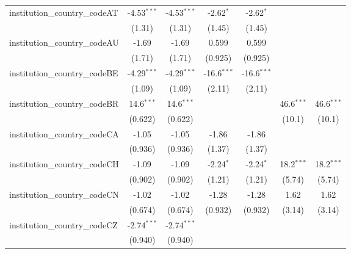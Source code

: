 \begin{tabular}{lcccccc}
   institution\_country\_codeAT          & -4.53$^{***}$ & -4.53$^{***}$ & -2.62$^{*}$   & -2.62$^{*}$   &               &   \\   
                                         & (1.31)        & (1.31)        & (1.45)        & (1.45)        &               &   \\   
   institution\_country\_codeAU          & -1.69         & -1.69         & 0.599         & 0.599         &               &   \\   
                                         & (1.71)        & (1.71)        & (0.925)       & (0.925)       &               &   \\   
   institution\_country\_codeBE          & -4.29$^{***}$ & -4.29$^{***}$ & -16.6$^{***}$ & -16.6$^{***}$ &               &   \\   
                                         & (1.09)        & (1.09)        & (2.11)        & (2.11)        &               &   \\   
   institution\_country\_codeBR          & 14.6$^{***}$  & 14.6$^{***}$  &               &               & 46.6$^{***}$  & 46.6$^{***}$\\   
                                         & (0.622)       & (0.622)       &               &               & (10.1)        & (10.1)\\   
   institution\_country\_codeCA          & -1.05         & -1.05         & -1.86         & -1.86         &               &   \\   
                                         & (0.936)       & (0.936)       & (1.37)        & (1.37)        &               &   \\   
   institution\_country\_codeCH          & -1.09         & -1.09         & -2.24$^{*}$   & -2.24$^{*}$   & 18.2$^{***}$  & 18.2$^{***}$\\   
                                         & (0.902)       & (0.902)       & (1.21)        & (1.21)        & (5.74)        & (5.74)\\   
   institution\_country\_codeCN          & -1.02         & -1.02         & -1.28         & -1.28         & 1.62          & 1.62\\   
                                         & (0.674)       & (0.674)       & (0.932)       & (0.932)       & (3.14)        & (3.14)\\   
   institution\_country\_codeCZ          & -2.74$^{***}$ & -2.74$^{***}$ &               &               &               &   \\   
                                         & (0.940)       & (0.940)       &               &               &               &   \\   

\end{tabular}
